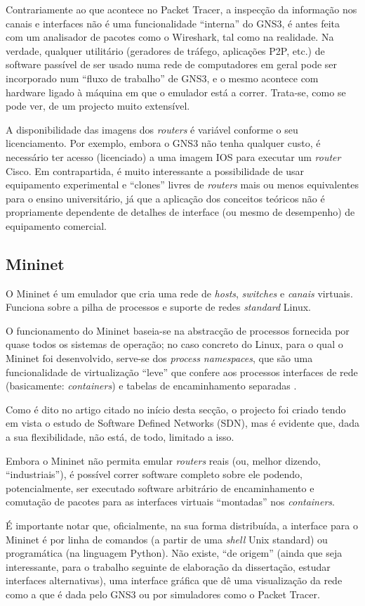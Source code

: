 Contrariamente ao que acontece no Packet Tracer, a inspecção da informação nos canais e interfaces não é uma funcionalidade ``interna'' do GNS3, é antes feita com um analisador de pacotes como o Wireshark, tal como na realidade. Na verdade, qualquer utilitário (geradores de tráfego, aplicações P2P, etc.) de software passível de ser usado numa rede de computadores em geral pode ser incorporado num ``fluxo de trabalho'' de GNS3, e o mesmo acontece com hardware ligado à máquina em que o emulador está a correr. Trata-se, como se pode ver, de um projecto muito extensível.

A disponibilidade das imagens dos \emph{routers} é variável conforme o seu licenciamento. Por exemplo, embora o GNS3 não tenha qualquer custo, é necessário ter acesso (licenciado) a uma imagem IOS para executar um \emph{router} Cisco. Em contrapartida, é muito interessante a possibilidade de usar equipamento experimental e ``clones'' livres de \emph{routers} mais ou menos equivalentes para o ensino universitário, já que a aplicação dos conceitos teóricos não é propriamente dependente de detalhes de interface (ou mesmo de desempenho) de equipamento comercial.

\subsection{Mininet}
\label{subsec:mininet}

O Mininet \cite{mininet2010} é um emulador que cria uma rede de \emph{hosts}, \emph{switches} e \emph{canais} virtuais. Funciona sobre a pilha de processos e suporte de redes \emph{standard} Linux.

O funcionamento do Mininet baseia-se na abstracção de processos fornecida por quase todos os sistemas de operação; no caso concreto do Linux, para o qual o Mininet foi desenvolvido, serve-se dos \emph{process namespaces}, que são uma funcionalidade de virtualização ``leve'' que confere aos processos interfaces de rede (basicamente: \emph{containers}) e tabelas de encaminhamento separadas \cite{mininetsite}.

Como é dito no artigo citado no início desta secção, o projecto foi criado tendo em vista o estudo de Software Defined Networks (SDN), mas é evidente que, dada a sua flexibilidade, não está, de todo, limitado a isso.

Embora o Mininet não permita emular \emph{routers} reais (ou, melhor dizendo, ``industriais''), é possível correr software completo sobre ele podendo, potencialmente, ser executado software arbitrário de encaminhamento e comutação de pacotes para as interfaces virtuais ``montadas'' nos \emph{containers}.

É importante notar que, oficialmente, na sua forma distribuída, a interface para o Mininet é por linha de comandos (a partir de uma \emph{shell} Unix standard) ou programática (na linguagem Python). Não existe, ``de origem'' (ainda que seja interessante, para o trabalho seguinte de elaboração da dissertação, estudar interfaces alternativas), uma interface gráfica que dê uma visualização da rede como a que é dada pelo GNS3 ou por simuladores como o Packet Tracer.

